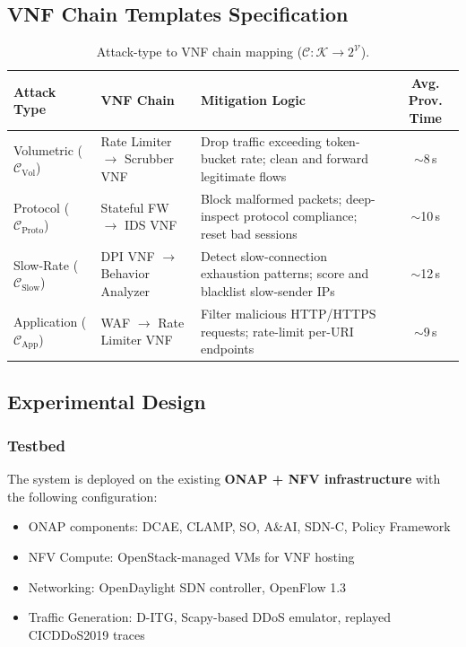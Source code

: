 \documentclass[12pt, a4paper]{article}
\begin{document}
\subsection{VNF Chain Templates Specification}

\begin{table}[h!]
\centering
\caption{Attack-type to VNF chain mapping ($\mathcal{C}: \mathcal{K} \to 2^{\mathcal{V}}$).}
\label{tab:vnf_chains}
\renewcommand{\arraystretch}{1.35}
\begin{tabular}{@{}lp{4.5cm}p{4.5cm}c@{}}
\toprule
\textbf{Attack Type} & \textbf{VNF Chain} & \textbf{Mitigation Logic} & \textbf{Avg. Prov. Time} \\
\midrule
Volumetric ($\mathcal{C}_{\text{Vol}}$)
  & Rate Limiter $\to$ Scrubber VNF
  & Drop traffic exceeding token-bucket rate; clean and forward legitimate flows
  & $\sim$8\,s \\
\addlinespace
Protocol ($\mathcal{C}_{\text{Proto}}$)
  & Stateful FW $\to$ IDS VNF
  & Block malformed packets; deep-inspect protocol compliance; reset bad sessions
  & $\sim$10\,s \\
\addlinespace
Slow-Rate ($\mathcal{C}_{\text{Slow}}$)
  & DPI VNF $\to$ Behavior Analyzer
  & Detect slow-connection exhaustion patterns; score and blacklist slow-sender IPs
  & $\sim$12\,s \\
\addlinespace
Application ($\mathcal{C}_{\text{App}}$)
  & WAF $\to$ Rate Limiter VNF
  & Filter malicious HTTP/HTTPS requests; rate-limit per-URI endpoints
  & $\sim$9\,s \\
\bottomrule
\end{tabular}
\end{table}

\subsection{Experimental Design}

\subsubsection{Testbed}
The system is deployed on the existing \textbf{ONAP + NFV infrastructure}
with the following configuration:
\begin{itemize}[noitemsep]
  \item ONAP components: DCAE, CLAMP, SO, A\&AI, SDN-C, Policy Framework
  \item NFV Compute: OpenStack-managed VMs for VNF hosting
  \item Networking: OpenDaylight SDN controller, OpenFlow 1.3
  \item Traffic Generation: D-ITG, Scapy-based DDoS emulator,
        replayed CICDDoS2019 traces
\end{itemize}
\end{document}
